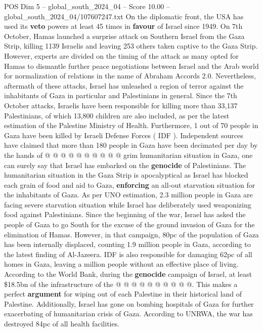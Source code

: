 \begin{textsample}{POS Dim 5 – global\_south\_2024\_04 – Score 10.00 – global\_south\_2024\_04/107607247.txt}  \label{ex:f5_pos_278}
On the diplomatic front, the USA has used its \textbf{veto} powers at least 45 times in \textbf{favour} of Israel since 1949.
On 7th October, Hamas launched a surprise attack on Southern Israel from the Gaza Strip, killing 1139 Israelis and leaving 253 others taken captive to the Gaza Strip.
However, experts are divided on the timing of the attack as many opted for Hamas to dismantle further peace negotiations between Israel and the Arab world for normalization of relations in the name of Abraham Accords 2.0.
Nevertheless, aftermath of these attacks, Israel has unleashed a region of terror against the inhabitants of Gaza in particular and Palestinians in general.
Since the 7th October attacks, Israelis have been responsible for killing more than 33,137 Palestinians, of which 13,800 children are also included, as per the latest estimation of the Palestine Ministry of Health.
Furthermore, 1 out of 70 people in Gaza have been killed by Israeli Defense Forces ( IDF ).
Independent sources have claimed that more than 180 people in Gaza have been decimated per day by the hands of @ @ @ @ @ @ @ @ @ @ grim humanitarian situation in Gaza, one can surely say that Israel has embarked on the \textbf{genocide} of Palestinians.
The humanitarian situation in the Gaza Strip is apocalyptical as Israel has blocked each grain of food and aid to Gaza, \textbf{enforcing} an all-out starvation situation for the inhabitants of Gaza.
As per UNO estimation, 2.3 million people in Gaza are facing severe starvation situation while Israel has deliberately used weaponizing food against Palestinians.
Since the beginning of the war, Israel has asked the people of Gaza to go South for the excuse of the ground invasion of Gaza for the elimination of Hamas.
However, in that campaign, 80pc of the population of Gaza has been internally displaced, counting 1.9 million people in Gaza, according to the latest finding of Al-Jazeera.
IDF is also responsible for damaging 62pc of all homes in Gaza, leaving a million people without an effective place of living.
According to the World Bank, during the \textbf{genocide} campaign of Israel, at least \$18.5bn of the infrastructure of the @ @ @ @ @ @ @ @ @ @.
This makes a perfect \textbf{argument} for wiping out of each Palestine in their historical land of Palestine.
Additionally, Israel has gone on bombing hospitals of Gaza for further exacerbating of humanitarian crisis of Gaza.
According to UNRWA, the war has destroyed 84pc of all health facilities.

\end{textsample}
